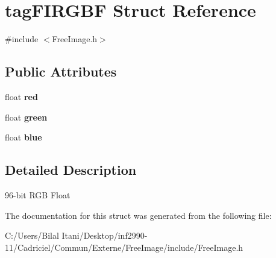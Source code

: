 \hypertarget{structtag_f_i_r_g_b_f}{}\section{tag\+F\+I\+R\+G\+BF Struct Reference}
\label{structtag_f_i_r_g_b_f}


{\ttfamily \#include $<$Free\+Image.\+h$>$}

\subsection*{Public Attributes}
\begin{DoxyCompactItemize}
\item 
float {\bfseries red}\hypertarget{structtag_f_i_r_g_b_f_ab15fa4a5afe84d7d66e598a1c1a17ffa}{}\label{structtag_f_i_r_g_b_f_ab15fa4a5afe84d7d66e598a1c1a17ffa}

\item 
float {\bfseries green}\hypertarget{structtag_f_i_r_g_b_f_ac062604601e6b4da84deb02a29287774}{}\label{structtag_f_i_r_g_b_f_ac062604601e6b4da84deb02a29287774}

\item 
float {\bfseries blue}\hypertarget{structtag_f_i_r_g_b_f_a18cf7966f5a4f5ffd0820aa5a18f8362}{}\label{structtag_f_i_r_g_b_f_a18cf7966f5a4f5ffd0820aa5a18f8362}

\end{DoxyCompactItemize}


\subsection{Detailed Description}
96-\/bit R\+GB Float 

The documentation for this struct was generated from the following file\+:\begin{DoxyCompactItemize}
\item 
C\+:/\+Users/\+Bilal Itani/\+Desktop/inf2990-\/11/\+Cadriciel/\+Commun/\+Externe/\+Free\+Image/include/Free\+Image.\+h\end{DoxyCompactItemize}
